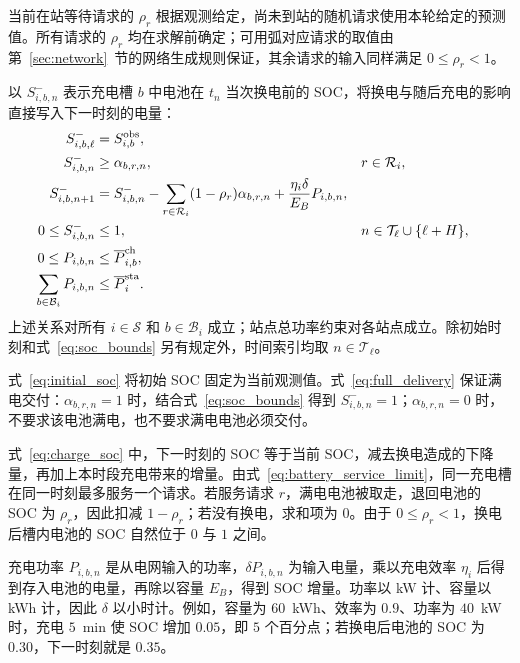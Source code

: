 当前在站等待请求的 $\rho_r$ 根据观测给定，尚未到站的随机请求使用本轮给定的预测值。所有请求的 $\rho_r$ 均在求解前确定；可用弧对应请求的取值由第~\ref{sec:network}~节的网络生成规则保证，其余请求的输入同样满足 $0\le\rho_r<1$。

以 $S_{i,b,n}^{-}$ 表示充电槽 $b$ 中电池在 $t_n$ 当次换电前的 SOC，将换电与随后充电的影响直接写入下一时刻的电量：
\begin{subequations}\label{eq:battery_dynamics}
\begin{align}
S_{i,b,\ell}^{-}&=S_{i,b}^{\mathrm{obs}},\label{eq:initial_soc}\\
S_{i,b,n}^{-}&\ge\alpha_{b,r,n},
&&r\in\mathcal R_i,\label{eq:full_delivery}\\
S_{i,b,n+1}^{-}&=S_{i,b,n}^{-}
-\sum_{r\in\mathcal R_i}(1-\rho_r)\alpha_{b,r,n}
+\frac{\eta_i\delta}{E_B}P_{i,b,n},\label{eq:charge_soc}\\
0\le S_{i,b,n}^{-}&\le1,
&&n\in\mathcal T_\ell\cup\{\ell+H\},\label{eq:soc_bounds}\\
0\le P_{i,b,n}&\le\overline P_{i,b}^{\mathrm{ch}},\label{eq:device_power}\\
\sum_{b\in\mathcal B_i}P_{i,b,n}&\le\overline P_i^{\mathrm{sta}}.\label{eq:station_power}
\end{align}
\end{subequations}
上述关系对所有 $i\in\mathcal S$ 和 $b\in\mathcal B_i$ 成立；站点总功率约束对各站点成立。除初始时刻和式~\eqref{eq:soc_bounds} 另有规定外，时间索引均取 $n\in\mathcal T_\ell$。

式~\eqref{eq:initial_soc} 将初始 SOC 固定为当前观测值。式~\eqref{eq:full_delivery} 保证满电交付：$\alpha_{b,r,n}=1$ 时，结合式~\eqref{eq:soc_bounds} 得到 $S_{i,b,n}^{-}=1$；$\alpha_{b,r,n}=0$ 时，不要求该电池满电，也不要求满电电池必须交付。

式~\eqref{eq:charge_soc} 中，下一时刻的 SOC 等于当前 SOC，减去换电造成的下降量，再加上本时段充电带来的增量。由式~\eqref{eq:battery_service_limit}，同一充电槽在同一时刻最多服务一个请求。若服务请求 $r$，满电电池被取走，退回电池的 SOC 为 $\rho_r$，因此扣减 $1-\rho_r$；若没有换电，求和项为 $0$。由于 $0\le\rho_r<1$，换电后槽内电池的 SOC 自然位于 $0$ 与 $1$ 之间。

充电功率 $P_{i,b,n}$ 是从电网输入的功率，$\delta P_{i,b,n}$ 为输入电量，乘以充电效率 $\eta_i$ 后得到存入电池的电量，再除以容量 $E_B$，得到 SOC 增量。功率以 kW 计、容量以 kWh 计，因此 $\delta$ 以小时计。例如，容量为 $60$~kWh、效率为 $0.9$、功率为 $40$~kW 时，充电 $5$~min 使 SOC 增加 $0.05$，即 $5$ 个百分点；若换电后电池的 SOC 为 $0.30$，下一时刻就是 $0.35$。

